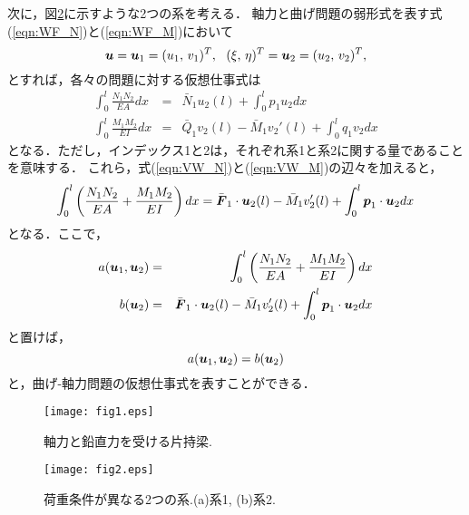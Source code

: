 \documentclass[10pt,a4j]{jarticle}
\begin{document}
次に，図\ref{fig:fig2}に示すような2つの系を考える．
軸力と曲げ問題の弱形式を表す式(\ref{eqn:WF_N})と(\ref{eqn:WF_M})において
\begin{equation}
	\fat{u}=\fat{u}_1=(u_1,\, v_1 )^T, 
	\ \ 
	(\xi,\, \eta )^T
	=
	\fat{u}_2=(u_2,\, v_2 )^T,
	\label{eqn:}
\end{equation}
とすれば，各々の問題に対する仮想仕事式は
\begin{eqnarray}
	\int_0^l \frac{N_1N_2}{EA}dx &= & 
	\bar N_1 u_2(l)+\int_0^l p_1u_2 dx 
	\label{eqn:VW_N}
	\\
	\int_0^l \frac{M_1M_2}{EI}dx &= & 
	\bar Q_1 v_2(l)-\bar M_1v_2'(l) +\int_0^l q_1v_2 dx 
	\label{eqn:VW_M}
\end{eqnarray}
となる．ただし，インデックス1と2は，それぞれ系1と系2に関する量であることを意味する．
これら，式(\ref{eqn:VW_N})と(\ref{eqn:VW_M})の辺々を加えると，
\begin{equation}
	\int_0^l \left( \frac{N_1N_2}{EA}+ \frac{M_1M_2}{EI} \right) dx 
	=
	\bar{\mbox{\boldmath $F$}}_1\cdot \mbox{\boldmath $u$}_2(l)-\bar{M}_1 v_2'(l)
	+
	\int_0^l \mbox{\boldmath $p$}_1\cdot \mbox{\boldmath $u$}_2 dx 
	\label{eqn:}
\end{equation}
となる．ここで，
\begin{eqnarray}
	a(\mbox{\boldmath $u$}_1,\mbox{\boldmath $u$}_2)&= & 
	\int_0^l \left( \frac{N_1N_2}{EA}+ \frac{M_1M_2}{EI} \right) dx 
	\label{eqn:def_a_NM}
	\\
	b(\mbox{\boldmath $u$}_2) &=& 
	\bar{\mbox{\boldmath $F$}}_1\cdot \mbox{\boldmath $u$}_2(l)-\bar{M}_1 v_2'(l)
	+
	\int_0^l \mbox{\boldmath $p$}_1\cdot \mbox{\boldmath $u$}_2 dx 
	\label{eqn:def_b_NM}
\end{eqnarray}
と置けば，
\begin{equation}
	a(\mbox{\boldmath $u$}_1,\mbox{\boldmath $u$}_2) = b(\mbox{\boldmath $u$}_2) 
	\label{eqn:VW_NM}
\end{equation}
と，曲げ-軸力問題の仮想仕事式を表すことができる．
\begin{figure}[h]
	\begin{center}
	\texttt{[image: fig1.eps]} 
	\end{center}
	\caption{軸力と鉛直力を受ける片持梁.} 
	\label{fig:fig1}
\end{figure}
\begin{figure}[h]
	\begin{center}
	\texttt{[image: fig2.eps]} 
	\end{center}
	\caption{荷重条件が異なる2つの系.(a)系1, (b)系2.} 
	\label{fig:fig2}
\end{figure}
\end{document}
